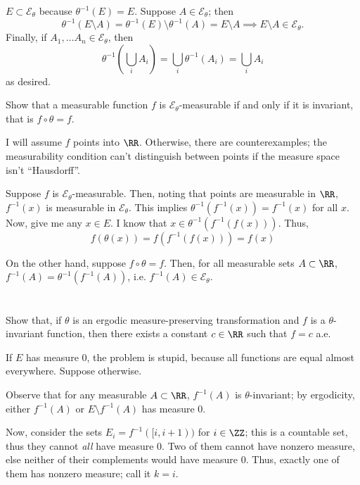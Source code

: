 \documentclass[11pt, headheight=30pt]{scrartcl}
\begin{document}
$E\subset \mathcal{E}_\theta$ because $\theta^{-1}(E) = E$. Suppose $A\in \mathcal{E}_\theta$; then
\[\theta^{-1}(E\setminus A) = \theta^{-1}(E)\setminus \theta^{-1}(A) = E\setminus A\implies E\setminus A\in \mathcal{E}_\theta.\]
Finally, if $A_1,\dots A_n\in \mathcal{E}_\theta$, then
\[
	\theta^{-1}\left(\bigcup_{i} A_i\right) = \bigcup_{i}\theta^{-1}\left(A_i\right) = \bigcup_{i} A_i
\]
as desired.

\begin{prob}
    Show that a measurable function
    $f$ is $\mathcal{E}_\theta$-measurable if and only if it is invariant,
    that is $f \circ \theta = f$.
\end{prob}
I will assume $f$ points into $\RR$. Otherwise, there are counterexamples;
the measurability condition can't distinguish between points if the measure
space isn't ``Hausdorff''.

Suppose $f$ is
$\mathcal{E}_\theta$-measurable. Then, noting that points are measurable
in $\RR$,
$f^{-1}(x)$ is measurable in $\mathcal{E}_\theta$. This implies
$\theta^{-1}(f^{-1}(x)) = f^{-1}(x)$ for all $x$. Now, give
me any $x\in E$. I know that $x\in \theta^{-1}(f^{-1}(f(x)))$.
Thus,
\[
    f(\theta(x)) = f(f^{-1}(f(x))) = f(x)    
\]

On the other hand, suppose $f\circ\theta = f$. Then, for all measurable
sets $A\subset \RR$, $f^{-1}(A) = \theta^{-1}(f^{-1}(A))$,
i.e. $f^{-1}(A) \in \mathcal{E}_\theta$.



\section{}
\begin{prob}
    Show that, if $\theta$ is an ergodic measure-preserving
    transformation and $f$ is a $\theta$-invariant
    function, then there exists a constant $c \in \RR$ such
    that $f = c$ a.e.
\end{prob}
If $E$ has measure $0$, the problem is stupid, because all functions
are equal almost everywhere. Suppose otherwise.

Observe that for any measurable $A\subset \RR$, $f^{-1}(A)$ is $\theta$-invariant;
by ergodicity, either $f^{-1}(A)$ or $E\setminus f^{-1}(A)$ has measure $0$.

Now, consider the sets $E_i = f^{-1}([i, i+1))$ for $i\in \ZZ$;
this is a countable set, thus they cannot \emph{all} have measure $0$.
Two of them cannot have nonzero measure, else neither of their complements
would have measure $0$. Thus, exactly
one of them has nonzero measure; call it $k = i$.
\end{document}
